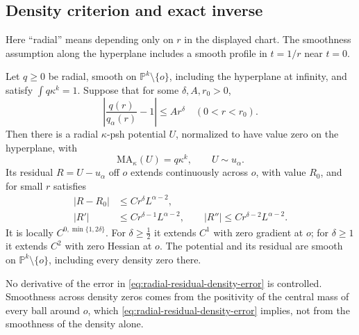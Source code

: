 \subsection{Density criterion and exact inverse}
Here ``radial'' means depending only on $r$ in the displayed chart.
The smoothness assumption along the hyperplane includes a smooth profile in $t=1/r$ near $t=0$.

\begin{theorem}\label{thm:radial-residual-regularity}
Let $q\ge0$ be radial, smooth on $\mathbb P^k\setminus\{o\}$, including
the hyperplane at infinity, and satisfy $\int q\kappa^k=1$.
Suppose that for some $\delta,A,r_0>0$,
\begin{equation}\label{eq:radial-residual-density-error}
 \left|\frac{q(r)}{q_\alpha(r)}-1\right|\le Ar^\delta
 \quad(0<r<r_0).
\end{equation}
Then there is a radial $\kappa$-psh potential $U$, normalized
to have value zero on the hyperplane, with
\[
 \mathrm{MA}_\kappa(U)=q\kappa^k,
 \qquad U\sim u_\alpha.
\]
Its residual $R=U-u_\alpha$ off $o$ extends continuously
across $o$, with value $R_0$, and for small $r$ satisfies
\begin{equation}\label{eq:radial-residual-estimates}
 \begin{aligned}
 |R-R_0|&\le Cr^\delta L^{\alpha-2},\\
 |R'|&\le Cr^{\delta-1}L^{\alpha-2},\qquad
 |R''|\le Cr^{\delta-2}L^{\alpha-2}.
 \end{aligned}
\end{equation}
It is locally $C^{0,\min\{1,2\delta\}}$.
For $\delta\ge\frac12$ it extends $C^1$ with zero gradient at $o$;
for $\delta\ge1$ it extends $C^2$ with zero Hessian at $o$.
The potential and its residual are smooth on $\mathbb P^k\setminus\{o\}$,
including every density zero there.
\end{theorem}

No derivative of the error in \eqref{eq:radial-residual-density-error} is controlled.
Smoothness across density zeros comes from the positivity of the central mass
of every ball around $o$, which \eqref{eq:radial-residual-density-error} implies,
not from the smoothness of the density alone.

